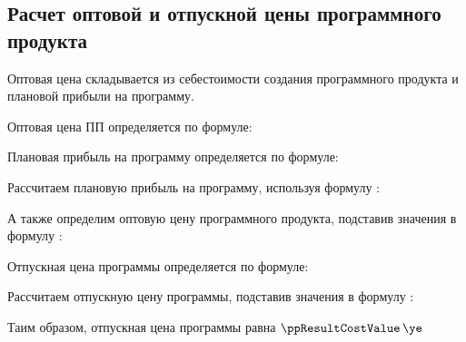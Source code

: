 \subsection{Расчет оптовой и отпускной цены программного продукта}
\label{sec:economics:ppoptcost}

Оптовая цена складывается из себестоимости создания программного продукта и плановой прибыли на программу.

Оптовая цена ПП определяется по формуле:
\ppOptPriceEquation

Плановая прибыль на программу определяется по формуле:
\plannedSoftIncomeEquation

Рассчитаем плановую прибыль на программу, используя формулу :
\plannedSoftIncomeFormulaApplied

А также определим оптовую цену программного продукта, подставив значения в формулу :
\ppOptPriceFormulaApplied

Отпускная цена программы определяется по формуле:
\ppResultCostEquation

Рассчитаем отпускную цену программы, подставив значения в формулу :
\ppResultCostFormulaApplied

Таим образом, отпускная цена программы равна \(\ppResultCostValue \, \ye\)